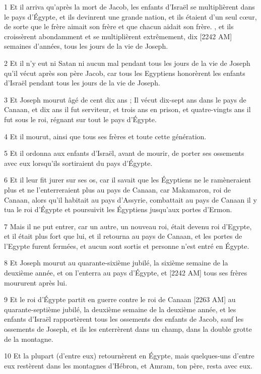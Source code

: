 \par 1 Et il arriva qu'après la mort de Jacob, les enfants d'Israël se multiplièrent dans le pays d'Égypte, et ils devinrent une grande nation, et ils étaient d'un seul cœur, de sorte que le frère aimait son frère et que chacun aidait son frère. , et ils croissèrent abondamment et se multiplièrent extrêmement, dix [2242 AM] semaines d'années, tous les jours de la vie de Joseph.
\par 2 Et il n'y eut ni Satan ni aucun mal pendant tous les jours de la vie de Joseph qu'il vécut après son père Jacob, car tous les Egyptiens honorèrent les enfants d'Israël pendant tous les jours de la vie de Joseph.
\par 3 Et Joseph mourut âgé de cent dix ans ; Il vécut dix-sept ans dans le pays de Canaan, et dix ans il fut serviteur, et trois ans en prison, et quatre-vingts ans il fut sous le roi, régnant sur tout le pays d'Égypte.
\par 4 Et il mourut, ainsi que tous ses frères et toute cette génération.
\par 5 Et il ordonna aux enfants d'Israël, avant de mourir, de porter ses ossements avec eux lorsqu'ils sortiraient du pays d'Égypte.
\par 6 Et il leur fit jurer sur ses os, car il savait que les Égyptiens ne le ramèneraient plus et ne l'enterreraient plus au pays de Canaan, car Makamaron, roi de Canaan, alors qu'il habitait au pays d'Assyrie, combattait au pays de Canaan il y tua le roi d'Égypte et poursuivit les Égyptiens jusqu'aux portes d'Ermon.
\par 7 Mais il ne put entrer, car un autre, un nouveau roi, était devenu roi d'Egypte, et il était plus fort que lui, et il retourna au pays de Canaan, et les portes de l'Egypte furent fermées, et aucun sont sortis et personne n’est entré en Égypte.
\par 8 Et Joseph mourut au quarante-sixième jubilé, la sixième semaine de la deuxième année, et on l'enterra au pays d'Égypte, et [2242 AM] tous ses frères moururent après lui.
\par 9 Et le roi d'Égypte partit en guerre contre le roi de Canaan [2263 AM] au quarante-septième jubilé, la deuxième semaine de la deuxième année, et les enfants d'Israël rapportèrent tous les ossements des enfants de Jacob, sauf les ossements de Joseph, et ils les enterrèrent dans un champ, dans la double grotte de la montagne.
\par 10 Et la plupart (d'entre eux) retournèrent en Égypte, mais quelques-uns d'entre eux restèrent dans les montagnes d'Hébron, et Amram, ton père, resta avec eux.
